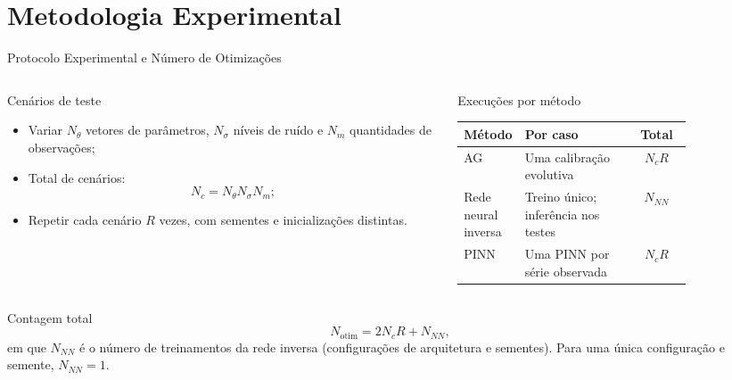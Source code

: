 \section{Metodologia Experimental}

\begin{frame}{Protocolo Experimental e Número de Otimizações}
\small
\begin{columns}[T,onlytextwidth]
    \begin{column}{0.42\textwidth}
        \begin{block}{Cenários de teste}
        \begin{itemize}
            \item Variar $N_\theta$ vetores de parâmetros,
            $N_\sigma$ níveis de ruído e $N_m$ quantidades
            de observações;
            \item Total de cenários:
            \[
            N_c=N_\theta N_\sigma N_m;
            \]
            \item Repetir cada cenário $R$ vezes, com sementes
            e inicializações distintas.
        \end{itemize}
        \end{block}
    \end{column}
    \begin{column}{0.55\textwidth}
        \begin{block}{Execuções por método}
        \centering
        \scriptsize
        \begin{tabular}{@{}p{0.24\linewidth}p{0.48\linewidth}c@{}}
        \toprule
        Método & Por caso & Total \\
        \midrule
        AG & Uma calibração evolutiva & $N_cR$ \\
        Rede neural inversa & Treino único; inferência nos testes & $N_{NN}$ \\
        PINN & Uma PINN por série observada & $N_cR$ \\
        \bottomrule
        \end{tabular}
        \end{block}
    \end{column}
\end{columns}

\vspace{0.1cm}
\begin{alertblock}{Contagem total}
\[
N_{\mathrm{otim}} = 2N_cR + N_{NN},
\]
em que $N_{NN}$ é o número de treinamentos da rede inversa
(configurações de arquitetura e sementes). Para uma única configuração
e semente, $N_{NN}=1$.
\end{alertblock}
\end{frame}

